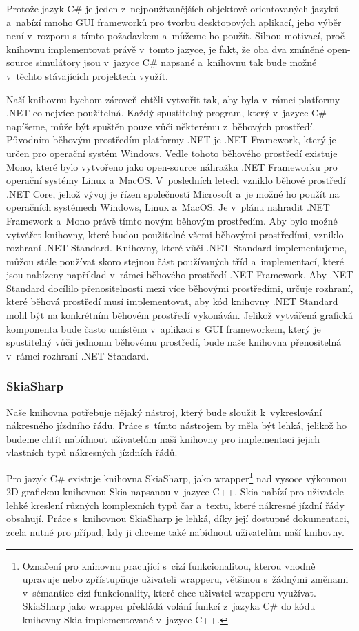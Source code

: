 Protože jazyk C\# je jeden z~nejpoužívanějších objektově orientovaných jazyků a~nabízí mnoho GUI frameworků pro tvorbu desktopových aplikací, jeho výběr není v~rozporu s~tímto požadavkem a~můžeme ho použít. Silnou motivací, proč knihovnu implementovat právě v~tomto jazyce, je fakt, že oba dva zmíněné open-source simulátory jsou v~jazyce C\# napsané a~knihovnu tak bude možné v~těchto stávajících projektech využít.

Naší knihovnu bychom zároveň chtěli vytvořit tak, aby byla v~rámci platformy .NET co nejvíce použitelná. Každý spustitelný program, který v~jazyce C\# napíšeme, může být spuštěn pouze vůči některému z~běhových prostředí. Původním běhovým prostředím platformy .NET je .NET Framework, který je určen pro operační systém Windows. Vedle tohoto běhového prostředí existuje Mono, které bylo vytvořeno jako open-source náhražka .NET Frameworku pro operační systémy Linux a~MacOS. V~posledních letech vzniklo běhové prostředí .NET Core, jehož vývoj je řízen společností Microsoft a~je možné ho použít na operačních systémech Windows, Linux a~MacOS. Je v~plánu nahradit .NET Framework a~Mono právě tímto novým běhovým prostředím. Aby bylo možné vytvářet knihovny, které budou použitelné všemi běhovými prostředími, vzniklo rozhraní .NET Standard. Knihovny, které vůči .NET Standard implementujeme, můžou stále používat skoro stejnou část používaných tříd a~implementací, které jsou nabízeny například v~rámci běhového prostředí .NET Framework. Aby .NET Standard docílilo přenositelnosti mezi více běhovými prostředími, určuje rozhraní, které běhová prostředí musí implementovat, aby kód knihovny .NET Standard mohl být na konkrétním běhovém prostředí vykonáván.
Jelikož vytvářená grafická komponenta bude často umístěna v~aplikaci s~GUI frameworkem, který je spustitelný vůči jednomu běhovému prostředí, bude naše knihovna přenositelná v~rámci rozhraní .NET Standard.

\subsubsection*{SkiaSharp}
Naše knihovna potřebuje nějaký nástroj, který bude sloužit k~vykreslování nákresného jízdního řádu. Práce s~tímto nástrojem by měla být lehká, jelikož ho budeme chtít nabídnout uživatelům naší knihovny pro implementaci jejich vlastních typů nákresných jízdních řádů.

Pro jazyk C\# existuje knihovna SkiaSharp, jako wrapper\footnote{Označení pro knihovnu pracující s~cizí funkcionalitou, kterou vhodně upravuje nebo zpřístupňuje uživateli wrapperu, většinou s~žádnými změnami v~sémantice cizí funkcionality, které chce uživatel wrapperu využívat. SkiaSharp jako wrapper překládá volání funkcí z~jazyka C\# do kódu knihovny Skia implementované v~jazyce C++.} nad vysoce výkonnou 2D grafickou knihovnou Skia napsanou v~jazyce C++. Skia nabízí pro uživatele lehké kreslení různých komplexních typů čar a~textu, které nákresné jízdní řády obsahují. Práce s~knihovnou SkiaSharp je lehká, díky její dostupné dokumentaci, zcela nutné pro případ, kdy ji chceme také nabídnout uživatelům naší knihovny.


